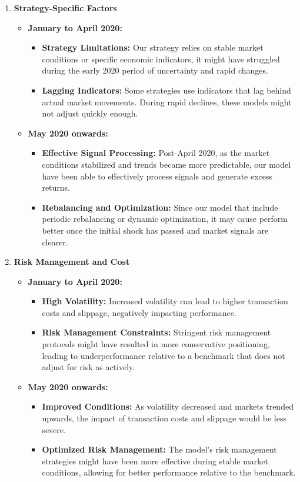 \documentclass[conference]{IEEEtran}
\begin{document}
\begin{enumerate}
    \item \textbf{Strategy-Specific Factors}
    \begin{itemize}
        \item \textbf{January to April 2020:}
        \begin{itemize}
            \item \textbf{Strategy Limitations:} Our strategy relies on stable market conditions or specific economic indicators, it might have struggled during the early 2020 period of uncertainty and rapid changes.
            \item \textbf{Lagging Indicators:} Some strategies use indicators that lag behind actual market movements. During rapid declines, these models might not adjust quickly enough.
        \end{itemize}
        \item \textbf{May 2020 onwards:}
        \begin{itemize}
            \item \textbf{Effective Signal Processing:} Post-April 2020, as the market conditions stabilized and trends became more predictable, our model have been able to effectively process signals and generate excess returns.
            \item \textbf{Rebalancing and Optimization:} Since our model that include periodic rebalancing or dynamic optimization, it may cause perform better once the initial shock has passed and market signals are clearer.
        \end{itemize}
    \end{itemize}

    \item \textbf{Risk Management and Cost}
    \begin{itemize}
        \item \textbf{January to April 2020:}
        \begin{itemize}
            \item \textbf{High Volatility:} Increased volatility can lead to higher transaction costs and slippage, negatively impacting performance.
            \item \textbf{Risk Management Constraints:} Stringent risk management protocols might have resulted in more conservative positioning, leading to underperformance relative to a benchmark that does not adjust for risk as actively.
        \end{itemize}
        \item \textbf{May 2020 onwards:}
        \begin{itemize}
            \item \textbf{Improved Conditions:} As volatility decreased and markets trended upwards, the impact of transaction costs and slippage would be less severe.
            \item \textbf{Optimized Risk Management:} The model’s risk management strategies might have been more effective during stable market conditions, allowing for better performance relative to the benchmark.
        \end{itemize}
    \end{itemize}

\end{enumerate}
\end{document}
